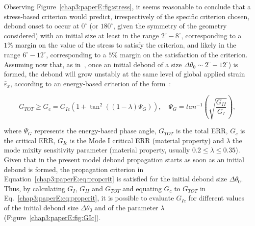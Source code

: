 Observing Figure~\ref{chap3:paperE:fig:stress}, it seems reasonable to conclude that a stress-based criterion would predict, irrespectively of the specific criterion chosen, debond onset to occur at $0^{\circ}$ (or $180^{\circ}$, given the symmetry of the geometry considered) with an initial size at least in the range $2^{\circ}-8^{\circ}$, corresponding to a $1\%$ margin on the value of the stress to satisfy the criterion, and likely in the range $6^{\circ}-12^{\circ}$, corresponding to a $5\%$ margin on the satisfaction of the criterion.\\
Assuming now that, as in~\cite{Correa2016}, once an initial debond of a size $\Delta\theta_{0}\sim2^{\circ}-12^{\circ}$) is formed, the debond will grow unstably at the same level of global applied strain $\bar{\varepsilon}_{x}$, according to an energy-based criterion of the form~\cite{Hutchinson1991,Mantic2009}:

\begin{equation}\label{chap3:paperE:eq:propcrit}
G_{TOT}\geq G_{c}=G_{Ic}\left(1+\tan^{2}\left(\left(1-\lambda\right)\Psi_{G}\right)\right),\quad\Psi_{G}=tan^{-1}\left(\sqrt{\frac{G_{II}}{G_{I}}}\right),
\end{equation}

where $\Psi_{G}$ represents the energy-based phase angle, $G_{TOT}$ is the total ERR, $G_{c}$ is the critical ERR, $G_{Ic}$ is the Mode I critical ERR (material property) and $\lambda$ the mode mixity sensitivity parameter (material property, usually $0.2\leq\lambda\leq0.35$). Given that in the present model debond propagation starts as soon as an initial debond is formed, the propagation criterion in Equation~\ref{chap3:paperE:eq:propcrit} is satisfied for the initial debond size $\Delta\theta_{0}$. Thus, by calculating $G_{I}$, $G_{II}$ and $G_{TOT}$ and equating $G_{c}$ to $G_{TOT}$ in Eq.~\ref{chap3:paperE:eq:propcrit}, it is possible to evaluate $G_{Ic}$ for different values of the initial debond size $\Delta\theta_{0}$ and of the parameter $\lambda$ (Figure~\ref{chap3:paperE:fig:GIc}).

